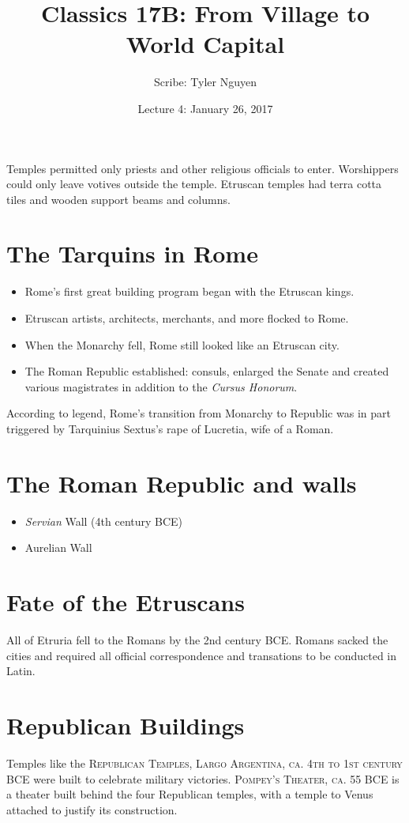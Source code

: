 \documentclass{article}
\begin{document}
\title{Classics 17B: From Village to World Capital}
\author{Scribe: Tyler Nguyen}
\date{Lecture 4: January 26, 2017}
\maketitle
Temples permitted only priests and other religious officials to enter.  Worshippers could only leave votives outside the temple.  Etruscan temples had terra cotta tiles and wooden support beams and columns.
\section{The Tarquins in Rome}
\begin{itemize}
\item Rome's first great building program began with the Etruscan kings.
\item Etruscan artists, architects, merchants, and more flocked to Rome.
\item When the Monarchy fell, Rome still looked like an Etruscan city.
\item The Roman Republic established: consuls, enlarged the Senate and created various magistrates in addition to the \textit{Cursus Honorum}.
\end{itemize}
According to legend, Rome's transition from Monarchy to Republic was in part triggered by Tarquinius Sextus's rape of Lucretia, wife of a Roman.
\section{The Roman Republic and walls}
\begin{itemize}
\item \textit{Servian} Wall (4th century BCE)
\item Aurelian Wall
\end{itemize}
\section{Fate of the Etruscans}
All of Etruria fell to the Romans by the 2nd century BCE.  Romans sacked the cities and required all official correspondence and transations to be conducted in Latin.
\section{Republican Buildings}
Temples like the \textsc{Republican Temples, Largo Argentina, ca. 4th to 1st century BCE} were built to celebrate military victories.  \textsc{Pompey's Theater, ca. 55 BCE} is a theater built behind the four Republican temples, with a temple to Venus attached to justify its construction.
\end{document}
